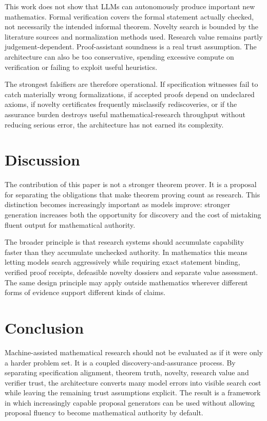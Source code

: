 \documentclass[11pt]{article}
\begin{document}
This work does not show that LLMs can autonomously produce important new mathematics. Formal verification covers the formal statement actually checked, not necessarily the intended informal theorem. Novelty search is bounded by the literature sources and normalization methods used. Research value remains partly judgement-dependent. Proof-assistant soundness is a real trust assumption. The architecture can also be too conservative, spending excessive compute on verification or failing to exploit useful heuristics.

The strongest falsifiers are therefore operational. If specification witnesses fail to catch materially wrong formalizations, if accepted proofs depend on undeclared axioms, if novelty certificates frequently misclassify rediscoveries, or if the assurance burden destroys useful mathematical-research throughput without reducing serious error, the architecture has not earned its complexity.

\section{Discussion}

The contribution of this paper is not a stronger theorem prover. It is a proposal for separating the obligations that make theorem proving count as research. This distinction becomes increasingly important as models improve: stronger generation increases both the opportunity for discovery and the cost of mistaking fluent output for mathematical authority.

The broader principle is that research systems should accumulate capability faster than they accumulate unchecked authority. In mathematics this means letting models search aggressively while requiring exact statement binding, verified proof receipts, defeasible novelty dossiers and separate value assessment. The same design principle may apply outside mathematics wherever different forms of evidence support different kinds of claims.

\section{Conclusion}

Machine-assisted mathematical research should not be evaluated as if it were only a harder problem set. It is a coupled discovery-and-assurance process. By separating specification alignment, theorem truth, novelty, research value and verifier trust, the architecture converts many model errors into visible search cost while leaving the remaining trust assumptions explicit. The result is a framework in which increasingly capable proposal generators can be used without allowing proposal fluency to become mathematical authority by default.
\end{document}
